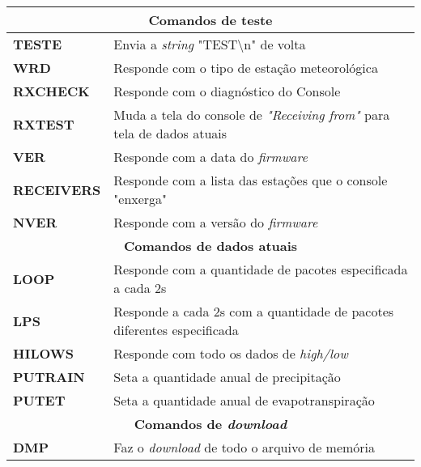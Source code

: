 \begin{anexosenv}
\begin{center}
\begin{longtable}{ll}
        \multicolumn{2}{c}{\cellcolor{gray!25}\textbf{Comandos de teste}}                                                   		 \\ \hline
        \textbf{TESTE}                            & Envia a \textit{string} "TEST\textbackslash n" de volta  \\ \hline
        \textbf{WRD}                        & Responde com o tipo de estação meteorológica \\ \hline
        \textbf{RXCHECK}                        & Responde com o diagnóstico do Console \\ \hline
        \textbf{RXTEST}                       & Muda a tela do console de \textit{"Receiving from"} para tela de dados atuais                                                        \\ \hline
        \textbf{VER}                           & Responde com a data do \textit{firmware}                                                             \\ \hline
        \textbf{RECEIVERS}                    & Responde com a lista das estações que o console "enxerga" \\ \hline
        \textbf{NVER}                       & Responde com a versão do \textit{firmware}                                                             \\ \hline
        \multicolumn{2}{c}{\cellcolor{gray!25}\textbf{Comandos de dados atuais}}                                             \\ \hline
        \textbf{LOOP}                     & Responde com a quantidade de pacotes especificada a cada 2s        \\ \hline
        \textbf{LPS}                & Responde a cada 2s com a quantidade de pacotes diferentes especificada          \\ \hline
        \textbf{HILOWS}                & Responde com todo os dados de \textit{high/low}                 \\ \hline
        \textbf{PUTRAIN}                      & Seta a quantidade anual de precipitação \\ \hline
        \textbf{PUTET}                 & Seta a quantidade anual de evapotranspiração        \\ \hline
        \multicolumn{2}{c}{\cellcolor{gray!25}\textbf{Comandos de \textit{download}}}                                     		 \\ \hline
        \textbf{DMP}                 & Faz o \textit{download} de todo o arquivo de memória \\ \hline

\end{longtable}
\end{center}
\end{anexosenv}
